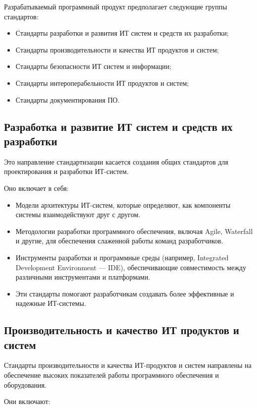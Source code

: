 Разрабатываемый программный продукт предполагает следующие группы стандартов:

\begin{itemize}
	\item Стандарты разработки и развития ИТ систем и средств их разработки;
	\item Стандарты производительности и качества ИТ продуктов и систем;
	\item Стандарты безопасности ИТ систем и информации;
	\item Стандарты интероперабельности ИТ продуктов и систем;
	\item Стандарты документирования ПО.
\end{itemize}

\subsection{Разработка и развитие ИТ систем и средств их разработки}

Это направление стандартизации касается создания общих стандартов
для проектирования и разработки ИТ-систем.

Оно включает в себя:

\begin{itemize}
	\item Модели архитектуры ИТ-систем, которые определяют,
		как компоненты системы взаимодействуют друг с другом.
	\item Методологии разработки программного обеспечения,
		включая Agile, Waterfall и другие,
		для обеспечения слаженной работы команд разработчиков.
	\item Инструменты разработки и программные среды
		(например, Integrated Development Environment — IDE),
		обеспечивающие совместимость между различными инструментами
		и платформами.
	\item Эти стандарты помогают разработчикам создавать более эффективные
		и надежные ИТ-системы.
\end{itemize}

\subsection{Производительность и качество ИТ продуктов и систем}

Стандарты производительности и качества ИТ-продуктов и систем
направлены на обеспечение высоких показателей работы программного обеспечения
и оборудования.

Они включают:

